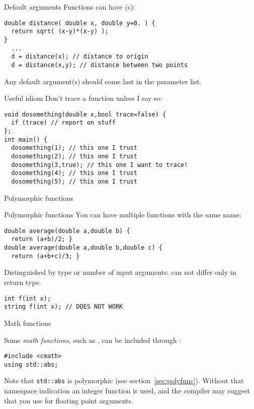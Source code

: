 \begin{block}{Default arguments}
  \label{sl:def-arg}
  Functions can have (s):
\begin{lstlisting}
double distance( double x, double y=0. ) {
  return sqrt( (x-y)*(x-y) );
}
  ...
  d = distance(x); // distance to origin
  d = distance(x,y); // distance between two points
\end{lstlisting}
Any default argument(s) should come last in the parameter list.
\end{block}

\begin{block}{Useful idiom}
  \label{sl:poly-trace}
  Don't trace a function unless I say so:
\begin{lstlisting}
void dosomething(double x,bool trace=false) {
  if (trace) // report on stuff
};
int main() {
  dosomething(1); // this one I trust
  dosomething(2); // this one I trust
  dosomething(3,true); // this one I want to trace!
  dosomething(4); // this one I trust
  dosomething(5); // this one I trust
\end{lstlisting}
\end{block}

 {Polymorphic functions}
\label{sec:polyfunc}

\begin{block}{Polymorphic functions}
  \label{sl:func-poly}
  You can have multiple functions with the same name:
\begin{lstlisting}
double average(double a,double b) {
  return (a+b)/2; }
double average(double a,double b,double c) {
  return (a+b+c)/3; }
\end{lstlisting}
Distinguished by type or number of input arguments:
can not differ only in return type.
\begin{lstlisting}
int f(int x);
string f(int x); // DOES NOT WORK
\end{lstlisting}
\end{block}

 {Math functions}
\label{sec:cmath}

Some \emph{math functions},
such as ,
can be included through :
\begin{lstlisting}
#include <cmath>
using std::abs;
\end{lstlisting}
Note that \lstinline+std::abs+ is polymorphic
(see section~\ref{sec:polyfunc}).
Without that namespace indication
an integer function  is used,
and the compiler may suggest that you use 
for floating point arguments.

